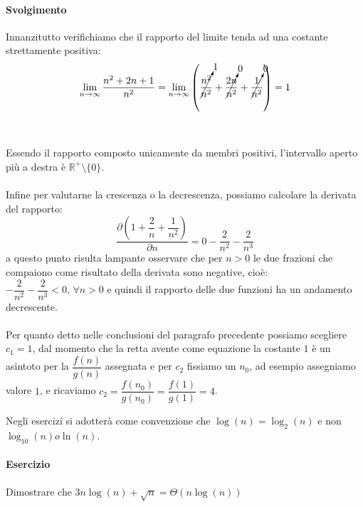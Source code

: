 \documentclass[11pt,a4paper,oneside]{article}
\begin{document}
\paragraph*{Svolgimento} Innanzitutto verifichiamo che il rapporto del limite tenda ad una costante strettamente positiva: $$\lim_{n\to \infty} \dfrac{n^2+2n+1}{n^2} = \lim_{n\to \infty} \left( \cancelto{1}{\dfrac{n^2}{n^2}} + \cancelto{0}{\dfrac{2n}{n^2}} + \cancelto{0}{\dfrac{1}{n^2}}\right) = 1$$\\\\Essendo il rapporto composto unicamente da membri positivi, l'intervallo aperto più a destra è $\mathbb{R}^{+}\setminus{\{0\}}$.\\\\Infine per valutarne la crescenza o la decrescenza, possiamo calcolare la derivata del rapporto:
$$\dfrac{\partial \left(1+\dfrac{2}{n}+\dfrac{1}{n^2} \right)}{\partial n} = 0 - \dfrac{2}{n^2} - \dfrac{2}{n^3}$$
a questo punto risulta lampante osservare che per $n > 0$ le due frazioni che compaiono come risultato della derivata sono negative, cioè: $-\dfrac{2}{n^2} -\dfrac{2}{n^3}<0,\,\forall n > 0$ e quindi il rapporto delle due funzioni ha un andamento decrescente.\\\\Per quanto detto nelle conclusioni del paragrafo precedente possiamo scegliere $c_1 = 1$, dal momento che la retta avente come equazione la costante $1$ è un asintoto per la $\dfrac{f(n)}{g(n)}$ assegnata e per $c_2$ fissiamo un $n_0$, ad esempio assegniamo valore $1$, e ricaviamo $c_2 = \dfrac{f(n_0)}{g(n_0)} = \dfrac{f(1)}{g(1)} = 4$.\\

\begin{tcolorbox}[title=Attenzione]
	Negli esercizi si adotterà come convenzione che $\log(n) = \log_2(n)$ e non $\log_{10}(n) o \ln(n)$.
\end{tcolorbox}

\pagebreak
\paragraph*{Esercizio} Dimostrare che $3n\log(n) + \sqrt{n} =  \Theta(n\log(n))$
\end{document}
